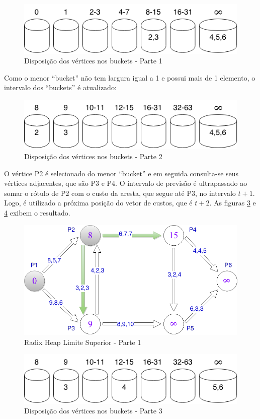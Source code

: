 \begin{figure}[htbp]
\centering
 \includegraphics[width=.50\textwidth]{chapters/fig/buckets1.png}
\caption{Disposição dos vértices nos buckets - Parte 1}
\label{fig:buckets1}
\end{figure}
\FloatBarrier

Como o menor ``bucket'' não tem largura igual a 1 e possui mais de 1 elemento, o intervalo dos ``buckets''
é atualizado:

\begin{figure}[htbp]
\centering
 \includegraphics[width=.50\textwidth]{chapters/fig/buckets2.png}
\caption{Disposição dos vértices nos buckets - Parte 2}
\label{fig:buckets2}
\end{figure}
\FloatBarrier

O vértice P2 é selecionado do menor ``bucket'' e em seguida consulta-se seus vértices adjacentes, que são P3 e P4.
O intervalo de previsão é ultrapassado ao somar o rótulo de P2 com o custo da aresta, que segue até P3, no intervalo $t + 1$. Logo, 
é utilizado a próxima posição do vetor de custos, que é $t + 2$. As figuras \ref{fig:limitesup1} e \ref{fig:buckets3} exibem o resultado.

\begin{figure}[htbp]
\centering
 \includegraphics[width=.50\textwidth]{chapters/fig/limitesup1.png}
\caption{Radix Heap Limite Superior - Parte 1}
\label{fig:limitesup1}
\end{figure}

\begin{figure}[htbp]
\centering
 \includegraphics[width=.50\textwidth]{chapters/fig/buckets3.png}
\caption{Disposição dos vértices nos buckets - Parte 3}
\label{fig:buckets3}
\end{figure}
\FloatBarrier

